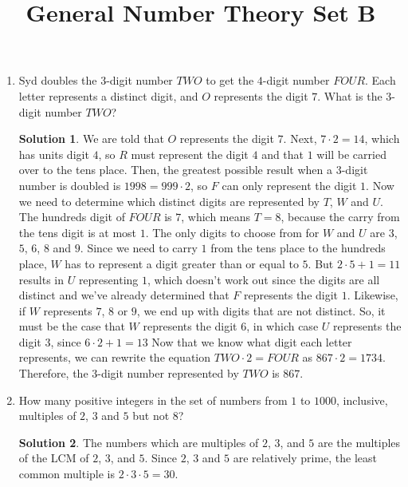 \documentclass{article}
\title{General Number Theory Set B}
\date{}
\author{}
\theoremstyle{definition}
\newtheorem*{solution}{Solution}
\begin{document}
\maketitle

\begin{multicols}{2}
    \begin{enumerate}
        \item Syd doubles the $3$-digit number $TWO$ to get the $4$-digit number $FOUR$.
        Each letter represents a distinct digit, and $O$ represents the digit $7$.
        What is the $3$-digit number $TWO$?
        \begin{solution}
            We are told that $O$ represents the digit $7$.
            Next, $7 \cdot 2 = 14$, which has units digit $4$, so $R$ must represent the digit $4$ and that $1$ will be carried over to the tens place.
            Then, the greatest possible result when a $3$-digit number is doubled is $1998 = 999 \cdot 2$, so $F$ can only represent the digit $1$.
            Now we need to determine which distinct digits are represented by $T$, $W$ and $U$.
            The hundreds digit of $FOUR$ is $7$, which means $T = 8$, because the carry from the tens digit is at most $1$.
            The only digits to choose from for $W$ and $U$ are $3$, $5$, $6$, $8$ and $9$.
            Since we need to carry $1$ from the tens place to the hundreds place, $W$ has to represent a digit greater than or equal to $5$.
            But $2 \cdot 5 + 1 = 11$ results in $U$ representing $1$, which doesn't work out since the digits are all distinct and we've already determined that $F$ represents the digit $1$.
            Likewise, if $W$ represents $7$, $8$ or $9$, we end up with digits that are not distinct.
            So, it must be the case that $W$ represents the digit $6$, in which case $U$ represents the digit $3$, since $6 \cdot 2 + 1 = 13$
            Now that we know what digit each letter represents, we can rewrite the equation $TWO \cdot 2 = FOUR$ as $867 \cdot 2 = 1734$.
            Therefore, the $3$-digit number represented by $TWO$ is $\boxed{867}$.
        \end{solution}
        \item How many positive integers in the set of numbers from $1$ to $1000$, inclusive, multiples of $2$, $3$ and $5$ but not $8$?
        \begin{solution}
            The numbers which are multiples of $2$, $3$, and $5$ are the multiples of the LCM of $2$, $3$, and $5$.
            Since $2$, $3$ and $5$ are relatively prime, the least common multiple is $2 \cdot 3 \cdot 5 = 30$.

\end{solution}
\end{enumerate}
\end{multicols}
\end{document}
